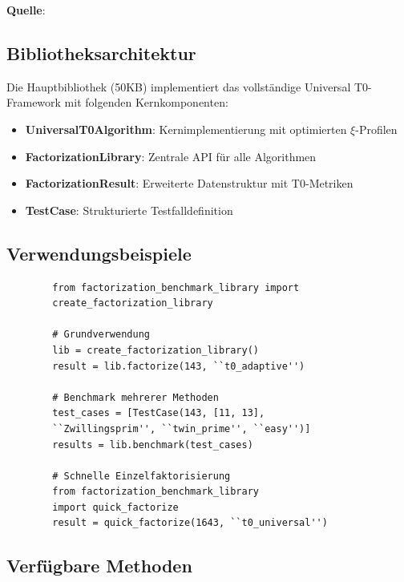 	\textbf{Quelle}: 
	
	\subsection{Bibliotheksarchitektur}
	
	Die Hauptbibliothek (50KB) implementiert das vollständige Universal T0-Framework mit folgenden Kernkomponenten:
	
	\begin{itemize}
		\item \textbf{UniversalT0Algorithm}: Kernimplementierung mit optimierten $\xi$-Profilen
		\item \textbf{FactorizationLibrary}: Zentrale API für alle Algorithmen
		\item \textbf{FactorizationResult}: Erweiterte Datenstruktur mit T0-Metriken
		\item \textbf{TestCase}: Strukturierte Testfalldefinition
	\end{itemize}
	
	\subsection{Verwendungsbeispiele}
	
	\begin{verbatim}
		from factorization_benchmark_library import 
		create_factorization_library
		
		# Grundverwendung
		lib = create_factorization_library()
		result = lib.factorize(143, ``t0_adaptive'')
		
		# Benchmark mehrerer Methoden
		test_cases = [TestCase(143, [11, 13], 
		``Zwillingsprim'', ``twin_prime'', ``easy'')]
		results = lib.benchmark(test_cases)
		
		# Schnelle Einzelfaktorisierung
		from factorization_benchmark_library 
		import quick_factorize
		result = quick_factorize(1643, ``t0_universal'')
	\end{verbatim}
	
	\subsection{Verfügbare Methoden}
	
